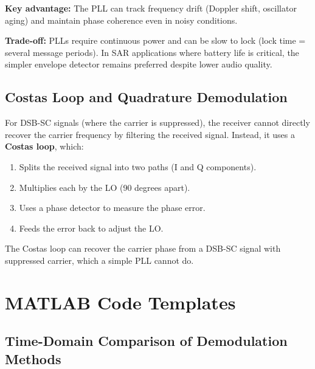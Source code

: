 \documentclass[11pt,letterpaper]{article}
\begin{document}
\noindent
\textbf{Key advantage:} The PLL can track frequency drift (Doppler shift, oscillator aging) and maintain phase coherence even in noisy conditions.

\noindent
\textbf{Trade-off:} PLLs require continuous power and can be slow to lock (lock time = several message periods). In SAR applications where battery life is critical, the simpler envelope detector remains preferred despite lower audio quality.

\subsection{Costas Loop and Quadrature Demodulation}

For DSB-SC signals (where the carrier is suppressed), the receiver cannot directly recover the carrier frequency by filtering the received signal. Instead, it uses a \textbf{Costas loop}, which:
\begin{enumerate}
    \item Splits the received signal into two paths (I and Q components).
    \item Multiplies each by the LO (90 degrees apart).
    \item Uses a phase detector to measure the phase error.
    \item Feeds the error back to adjust the LO.
\end{enumerate}

\noindent
The Costas loop can recover the carrier phase from a DSB-SC signal with suppressed carrier, which a simple PLL cannot do.

\section{MATLAB Code Templates}

\subsection{Time-Domain Comparison of Demodulation Methods}
\end{document}
